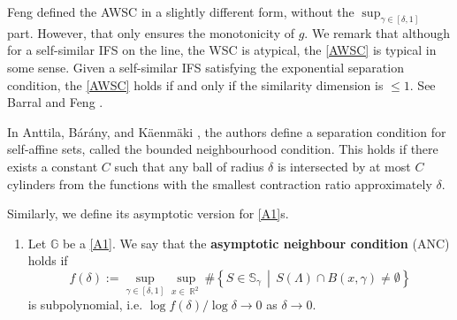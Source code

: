 \documentclass[a4paper, 11pt]{article}
\DeclareMathOperator{\R}{\mathbb{R}}
\numberwithin{equation}{section}
\theoremstyle{plain}
\theoremstyle{remark}
\theoremstyle{definition}
\begin{document}
Feng \cite{MR2322179} defined the AWSC in a slightly different form, without the $\sup_{\gamma \in [\delta,1]}$ part. However, that only ensures the monotonicity of $g$. We remark that although for a self-similar IFS on the line, the WSC is atypical, the \ref{AWSC} is typical in some sense. Given a self-similar IFS satisfying the exponential separation condition, the \ref{AWSC} holds if and only if the similarity dimension is $\leq 1$. See Barral and Feng \cite{barral2020multifractalformalismselfsimilarmeasures}.


In Anttila, Bárány, and Käenmäki \cite{ANTTILA_2023}, the authors define a separation condition for self-affine sets, called the bounded neighbourhood condition. This holds if there exists a constant $C$ such that any ball of radius $\delta$ is intersected by at most $C$ cylinders from the functions with the smallest contraction ratio approximately $\delta$.

Similarly, we define its asymptotic version for \ref{A1}s.

\begin{enumerate}[label = $$, leftmargin=0pt, ref = ANC]
\item\label{ANC} Let $\mathbb{G}$ be a \ref{A1}. We say that the \textbf{asymptotic neighbour condition} (ANC) holds if
\[
f(\delta) := \sup_{\gamma \in [\delta,1]}\sup_{x \in \R^2}\#\left\{S \in \mathbb{S}_\gamma \, \middle|\, S(\Lambda) \cap B(x,\gamma) \neq \emptyset \right\}
\]
is subpolynomial, i.e. $\log f(\delta)/\log\delta\to0$ as $\delta\to0$.
\end{enumerate}
\end{document}
